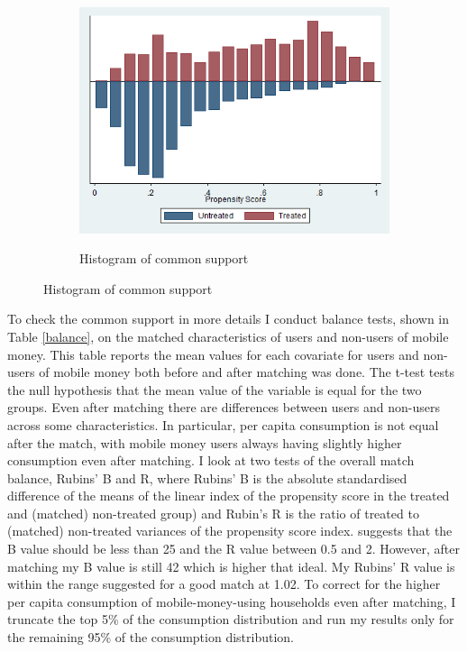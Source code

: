 \begin{figure}[h]
\centering
\caption{Histograms of common support}
\begin{subfigure}[h]{0.4\textwidth}
\caption{Histogram of common support }
\includegraphics[width=\textwidth,trim= 0.5cm 0cm 0.5cm 0.5cm, clip=true, keepaspectratio]{common_support} \label{common_support}
\end{subfigure}

\end{figure}

To check the common support in more details I conduct balance tests, shown in Table \ref{balance}, on the matched characteristics of users and non-users of mobile money. This table reports the mean values for each covariate for users and non-users of mobile money both before and after matching was done. The t-test tests the null hypothesis that the mean value of the variable is equal for the two groups. Even after matching there are differences between users and non-users across some characteristics. In particular, per capita consumption is not equal after the match, with mobile money users always having slightly higher consumption even after matching. I look at two tests of the overall match balance, Rubins' B and R, where Rubins' B is the absolute standardised difference of the means of the linear index of the propensity score in the treated and (matched) non-treated group) and Rubin's R is the ratio of treated to (matched) non-treated variances of the propensity score index. \cite{rubin2001} suggests that the B value should be less than 25 and the R value between 0.5 and 2. However, after matching my B value is  still 42 which is higher that ideal. My Rubins' R value is within the range suggested for a good match at 1.02. To correct for the higher per capita consumption of mobile-money-using households even after matching, I truncate the top 5\% of the consumption distribution and run my results only for the remaining 95\% of the consumption distribution. 




\clearpage
